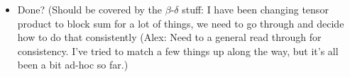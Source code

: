 \documentclass{amsart}
\begin{document}
\begin{itemize}
\item Done? (Should be covered by the $\beta$-$\delta$ stuff: I have been changing tensor product to block sum for a lot of things, we need to go through and decide how to do that consistently (Alex: Need to a general read through for consistency. I've tried to match a few things up along the way, but it's all been a bit ad-hoc so far.)
\end{itemize}
\end{document}
